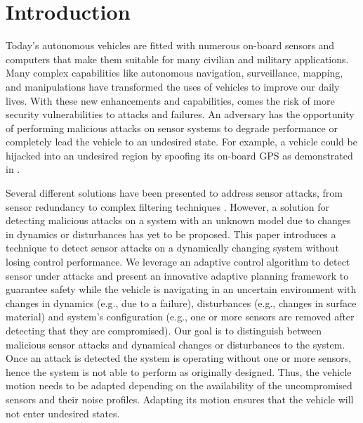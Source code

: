 
\section{Introduction} \label{sec:introduction}

Today's autonomous vehicles are fitted with numerous on-board sensors and computers that make them suitable for many civilian and military applications. Many complex capabilities like autonomous navigation, surveillance, mapping, and manipulations have transformed the uses of vehicles to improve our daily lives. 
With these new enhancements and capabilities, comes the risk of more security vulnerabilities to attacks and failures. An adversary has the opportunity of performing malicious attacks on sensor systems to degrade performance or completely lead the vehicle to an undesired state. For example, a vehicle could be hijacked into an undesired region by spoofing its on-board GPS as demonstrated in \cite{lee}.

Several different solutions have been presented to address sensor attacks, from sensor redundancy to complex filtering techniques \cite{fawzi2014secure,pasqualetti2013attack,6120187,6943080,7330811}. However, a solution for detecting malicious attacks on a system with an unknown model due to changes in dynamics or disturbances has yet to be proposed. This paper introduces a technique to detect sensor attacks on a dynamically changing system without losing control performance. We leverage an adaptive control algorithm to detect sensor under attacks and present an innovative adaptive planning framework to guarantee safety while the vehicle is navigating in an uncertain environment with changes in dynamics (e.g., due to a failure), disturbances (e.g., changes in surface material) and system's configuration (e.g., one or more sensors are removed after detecting that they are compromised). 
Our goal is to distinguish between malicious sensor attacks and dynamical changes or disturbances to the system. Once an attack is detected the system is operating without one or more sensors, hence the system is not able to perform as originally designed.  Thus, the vehicle motion needs to be adapted depending on the availability of the uncompromised sensors and their noise profiles. Adapting its motion ensures that the vehicle will not enter undesired states. 

